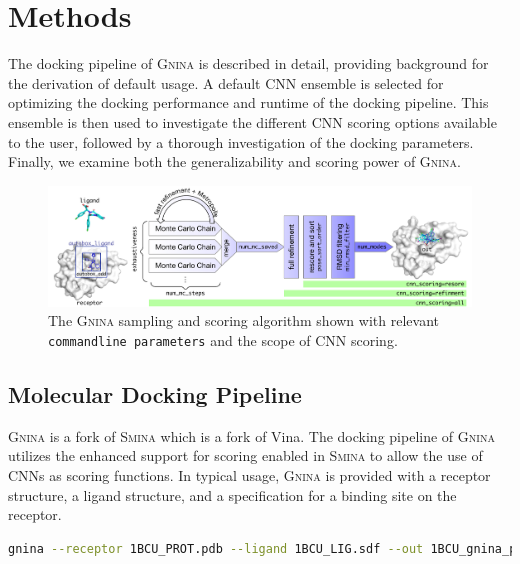 \documentclass[journal=jcisd8,manuscript=article]{achemso}
\begin{document}
\section{Methods}

The docking pipeline of \textsc{Gnina} is described in detail, providing background for the derivation of default usage. A default CNN ensemble is selected for optimizing the docking performance and runtime of the docking pipeline. This ensemble is then used to investigate the different CNN scoring options available to the user, followed by a thorough investigation of the docking parameters. Finally, we examine both the generalizability and scoring power of \textsc{Gnina}.

\begin{figure}[htb]
    \centering
    \includegraphics[width=\linewidth]{figures/gnina}
    \caption{The \textsc{Gnina} sampling and scoring algorithm shown with relevant \texttt{commandline parameters} and the scope of CNN scoring.}
    \label{fig:workflow}
\end{figure}

\subsection{Molecular Docking Pipeline}
\textsc{\textsc{Gnina}} is a fork of \textsc{Smina}\cite{koes2013lessons} which is a fork of Vina\cite{trott2010autodock}. The docking pipeline of \textsc{\textsc{Gnina}} utilizes the enhanced support for scoring enabled in \textsc{Smina} to allow the use of CNNs as scoring functions. In typical usage, \textsc{\textsc{Gnina}} is provided with a receptor structure, a ligand structure, and a specification for a binding site on the receptor.

\begin{lstlisting}[title=Example Gnina Usage,label=code:Usage,language=bash,basicstyle=\tt]
    gnina --receptor 1BCU_PROT.pdb --ligand 1BCU_LIG.sdf --out 1BCU_gnina_poses.sdf.gz --autobox_ligand 1BCU_LIG.sdf --autobox_add 4 --cnn crossdock_default2018 dense_3 --cnn_scoring rescore --exhaustiveness 8 --num_mc_saved 50 --cnn_rotation 0 --num_modes 9 --min_rmsd_filter 1
\end{lstlisting}
\end{document}
